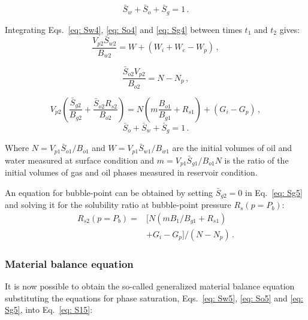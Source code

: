 \documentclass[authoryear,preprint,review,11pt]{elsarticle}
\begin{document}
\begin{equation}\label{eq: S14}
\bar{S}_w+\bar{S}_o+\bar{S}_g=1 \, .
\end{equation}

Integrating Eqs.~\eqref{eq: Sw4}, \eqref{eq: So4} and \eqref{eq: Sg4} between times $t_1$ and $t_2$ gives:
\begin{equation}\label{eq: Sw5}
\frac{V_{p2} \bar{S}_{w2}}{B_{w2}}=W+\left(W_i+W_e-W_p\right) \, ,
\end{equation}

\begin{equation}\label{eq: So5}
\frac{\bar{S}_{o2} V_{p2}}{B_{o2}} = N-N_p \, ,
\end{equation}

\begin{equation}\label{eq: Sg5}
V_{p2}\left(\frac{\bar{S}_{g2}}{B_{g2}} +\frac{\bar{S}_{o2} R_{s2}}{B_{o2}}\right) = N\left(m\frac{B_{o1}}{B_{g1}} + R_{s1}\right) +\left(G_i-G_p\right) \, ,
\end{equation}
%
\begin{equation}\label{eq: S15}
\bar{S}_o+\bar{S}_w+\bar{S}_g=1 \, .
\end{equation}

Where $N=V_{p1} \bar{S}_{o1}/B_{o1}$ and $W=V_{p1} \bar{S}_{w1}/B_{w1}$ are the initial volumes of oil and water measured at surface condition and $m=V_{p1} \bar{S}_{g1}/B_{o1} N$ is the ratio of the initial volumes of gas and oil phases measured in reservoir condition.

An equation for bubble-point can be obtained by setting $\bar{S}_{g2}=0$ in Eq.~\eqref{eq: Sg5} and solving it for the solubility ratio at bubble-point pressure $R_s(p=P_b)$:
\begin{equation}
\begin{split}
R_{s2}\left(p=P_b\right) = &\Big[N\left(m B_{1}/B_{g1} +R_{s1}\right)\\
&+G_i-G_p\Big]/\left(N-N_p\right) \, .
\end{split}
\end{equation}

\subsubsection{Material balance equation}

It is now possible to obtain the so-called generalized material balance equation substituting the equations for phase saturation, Eqs.~\eqref{eq: Sw5}, \eqref{eq: So5} and \eqref{eq: Sg5}, into Eq.~\eqref{eq: S15}:  
\end{document}
